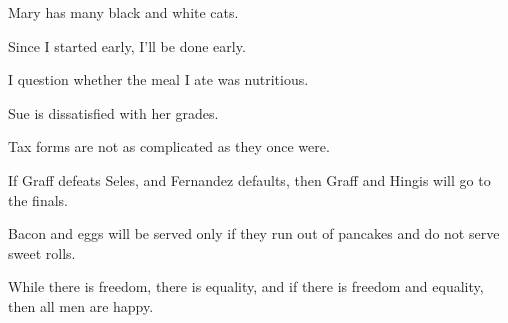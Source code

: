 \begin{enumerate}
\begin{statement}{Mary has many black and white cats.}
\end{statement}

\begin{statement}{Since I started early, I’ll be done early.}
\end{statement}

\begin{statement}{I question whether the meal I ate was nutritious.}
\end{statement}

\begin{statement}{Sue is dissatisfied with her grades.}
\end{statement}

\begin{statement}{Tax forms are not as complicated as they once were.}
\end{statement}

\begin{statement}{If Graff defeats Seles, and Fernandez defaults, then Graff and Hingis will go to the finals.}
\end{statement}

\begin{statement}{Bacon and eggs will be served only if they run out of pancakes and do not serve sweet rolls.}
\end{statement}

\begin{statement}{While there is freedom, there is equality, and if there is freedom and equality, then all men are happy.}
\end{statement}


\end{enumerate}
